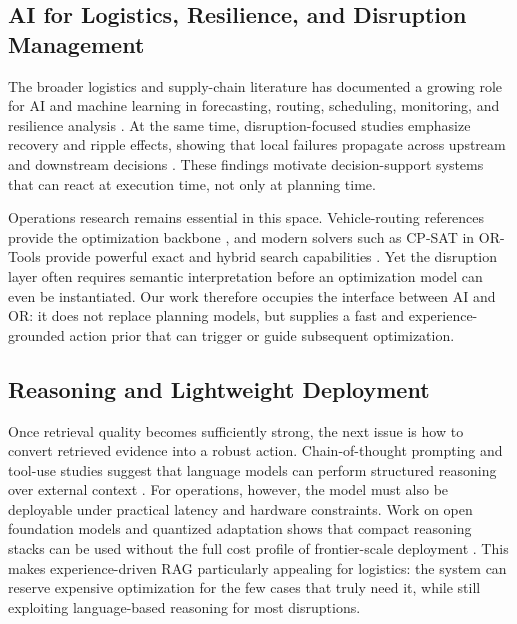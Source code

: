 \documentclass[conference]{IEEEtran}
\begin{document}
\subsection{AI for Logistics, Resilience, and Disruption Management}

The broader logistics and supply-chain literature has documented a growing role for AI and machine learning in forecasting, routing, scheduling, monitoring, and resilience analysis \cite{toorajipour2021ai,akbari2021ml}. At the same time, disruption-focused studies emphasize recovery and ripple effects, showing that local failures propagate across upstream and downstream decisions \cite{ivanov2017recovery,dolgui2018ripple}. These findings motivate decision-support systems that can react at execution time, not only at planning time.

Operations research remains essential in this space. Vehicle-routing references provide the optimization backbone \cite{toth2014vrp,pillac2013dvrp}, and modern solvers such as CP-SAT in OR-Tools provide powerful exact and hybrid search capabilities \cite{perron2023cpsat}. Yet the disruption layer often requires semantic interpretation before an optimization model can even be instantiated. Our work therefore occupies the interface between AI and OR: it does not replace planning models, but supplies a fast and experience-grounded action prior that can trigger or guide subsequent optimization.

\subsection{Reasoning and Lightweight Deployment}

Once retrieval quality becomes sufficiently strong, the next issue is how to convert retrieved evidence into a robust action. Chain-of-thought prompting and tool-use studies suggest that language models can perform structured reasoning over external context \cite{wei2022cot,schick2023toolformer}. For operations, however, the model must also be deployable under practical latency and hardware constraints. Work on open foundation models and quantized adaptation shows that compact reasoning stacks can be used without the full cost profile of frontier-scale deployment \cite{touvron2023llama,dettmers2023qlora,lin2024awq}. This makes experience-driven RAG particularly appealing for logistics: the system can reserve expensive optimization for the few cases that truly need it, while still exploiting language-based reasoning for most disruptions.
\end{document}
